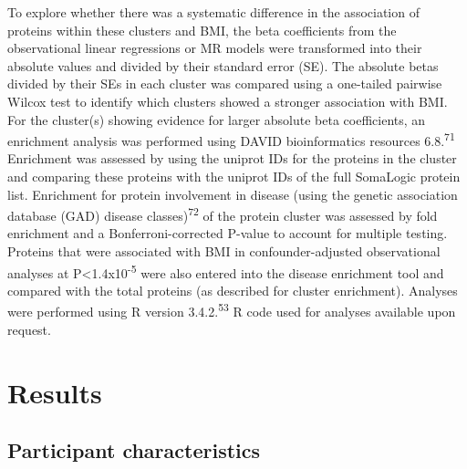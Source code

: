 \documentclass[11pt,twoside]{bristolthesis}
\begin{document}
To explore whether there was a systematic difference in the association of proteins within these clusters and BMI, the beta coefficients from the observational linear regressions or MR models were transformed into their absolute values and divided by their standard error (SE). The absolute betas divided by their SEs in each cluster was compared using a one-tailed pairwise Wilcox test to identify which clusters showed a stronger association with BMI. For the cluster(s) showing evidence for larger absolute beta coefficients, an enrichment analysis was performed using DAVID bioinformatics resources 6.8.\textsuperscript{71} Enrichment was assessed by using the uniprot IDs for the proteins in the cluster and comparing these proteins with the uniprot IDs of the full SomaLogic protein list. Enrichment for protein involvement in disease (using the genetic association database (GAD) disease classes)\textsuperscript{72} of the protein cluster was assessed by fold enrichment and a Bonferroni-corrected P-value to account for multiple testing. Proteins that were associated with BMI in confounder-adjusted observational analyses at P\textless1.4x10\textsuperscript{-5} were also entered into the disease enrichment tool and compared with the total proteins (as described for cluster enrichment). Analyses were performed using R version 3.4.2.\textsuperscript{53} R code used for analyses available upon request.

\hypertarget{results-3}{%
\section{Results}\label{results-3}}

\hypertarget{participant-characteristics-1}{%
\subsection{Participant characteristics}\label{participant-characteristics-1}}
\end{document}
